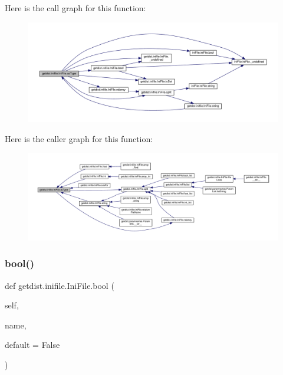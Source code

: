 Here is the call graph for this function\+:
\nopagebreak
\begin{figure}[H]
\begin{center}
\leavevmode
\includegraphics[width=350pt]{classgetdist_1_1inifile_1_1IniFile_a2ebf8b8ec5ec2f4776284314ae4d2a75_cgraph}
\end{center}
\end{figure}
Here is the caller graph for this function\+:
\nopagebreak
\begin{figure}[H]
\begin{center}
\leavevmode
\includegraphics[width=350pt]{classgetdist_1_1inifile_1_1IniFile_a2ebf8b8ec5ec2f4776284314ae4d2a75_icgraph}
\end{center}
\end{figure}
\mbox{\label{classgetdist_1_1inifile_1_1IniFile_a6f6192fc30f45202f5675ecd70856010}} 
\subsubsection{\texorpdfstring{bool()}{bool()}}
{\footnotesize\ttfamily def getdist.\+inifile.\+Ini\+File.\+bool (\begin{DoxyParamCaption}\item[{}]{self,  }\item[{}]{name,  }\item[{}]{default = {\ttfamily False} }\end{DoxyParamCaption})}

